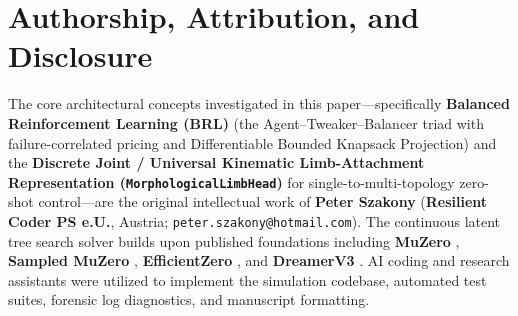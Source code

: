 \documentclass[11pt,a4paper]{article}
\begin{document}
\section*{Authorship, Attribution, and Disclosure}
The core architectural concepts investigated in this paper---specifically \textbf{Balanced Reinforcement Learning (BRL)} (the Agent--Tweaker--Balancer triad with failure-correlated pricing and Differentiable Bounded Knapsack Projection) and the \textbf{Discrete Joint / Universal Kinematic Limb-Attachment Representation (\texttt{MorphologicalLimbHead})} for single-to-multi-topology zero-shot control---are the original intellectual work of \textbf{Peter Szakony} (\textbf{Resilient Coder PS e.U.}, Austria; \texttt{peter.szakony@hotmail.com}). The continuous latent tree search solver builds upon published foundations including \textbf{MuZero} \cite{schrittwieser2020mastering}, \textbf{Sampled MuZero} \cite{hubert2021learning}, \textbf{EfficientZero} \cite{ye2021mastering}, and \textbf{DreamerV3} \cite{hafner2023mastering}. AI coding and research assistants were utilized to implement the simulation codebase, automated test suites, forensic log diagnostics, and manuscript formatting.



\end{document}
